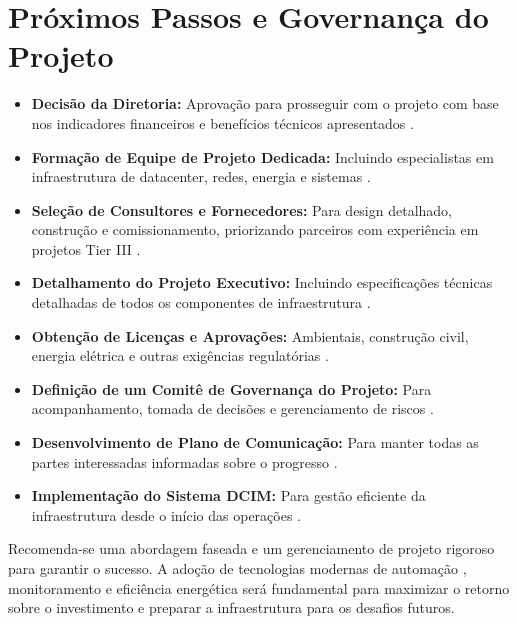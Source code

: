 \documentclass[
	12pt,				%
	oneside,			%
	a4paper,			%
	english,			%
	brazil				%
	]{abntex2unama}
\begin{document}
\section{Próximos Passos e Governança do Projeto}
\begin{itemize}
	\item \textbf{Decisão da Diretoria:} Aprovação para prosseguir com o projeto com base nos indicadores financeiros e benefícios técnicos apresentados \cite{capacity_planning}.
	\item \textbf{Formação de Equipe de Projeto Dedicada:} Incluindo especialistas em infraestrutura de datacenter, redes, energia e sistemas \cite{datacenter_automation}.
	\item \textbf{Seleção de Consultores e Fornecedores:} Para design detalhado, construção e comissionamento, priorizando parceiros com experiência em projetos Tier III \cite{reliability_engineering}.
	\item \textbf{Detalhamento do Projeto Executivo:} Incluindo especificações técnicas detalhadas de todos os componentes de infraestrutura \cite{design_principles}.
	\item \textbf{Obtenção de Licenças e Aprovações:} Ambientais, construção civil, energia elétrica e outras exigências regulatórias \cite{green_datacenters}.
	\item \textbf{Definição de um Comitê de Governança do Projeto:} Para acompanhamento, tomada de decisões e gerenciamento de riscos \cite{dcim_evolution}.
	\item \textbf{Desenvolvimento de Plano de Comunicação:} Para manter todas as partes interessadas informadas sobre o progresso \cite{datacenter_monitoring}.
	\item \textbf{Implementação do Sistema DCIM:} Para gestão eficiente da infraestrutura desde o início das operações \cite{dcim_systems}.
\end{itemize}

Recomenda-se uma abordagem faseada e um gerenciamento de projeto rigoroso para garantir o sucesso. A adoção de tecnologias modernas de automação \cite{ai_automation}, monitoramento \cite{datacenter_monitoring} e eficiência energética \cite{green_datacenters} será fundamental para maximizar o retorno sobre o investimento e preparar a infraestrutura para os desafios futuros.

\postextual
\end{document}
